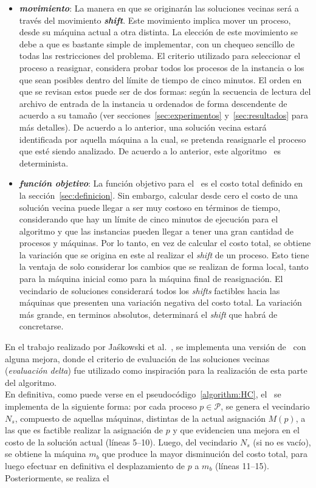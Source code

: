 \documentclass[../informe2.tex]{subfiles}
\begin{document}
\begin{itemize}
	\item \textbf{\textit{movimiento}}: La manera en que se originarán las soluciones vecinas será a través del movimiento \textbf{\textit{shift}}. Este movimiento implica mover un proceso, desde su máquina actual a otra distinta. La elección de este movimiento se debe a que es bastante simple de implementar, con un chequeo sencillo de todas las restricciones del problema. El criterio utilizado para seleccionar el proceso a reasignar, considera probar todos los procesos de la instancia o los que sean posibles dentro del límite de tiempo de cinco minutos. El orden en que se revisan estos puede ser de dos formas: según la secuencia de lectura del archivo de entrada de la instancia u ordenados de forma descendente de acuerdo a su tamaño (ver secciones~\ref{sec:experimentos} y~\ref{sec:resultados} para más detalles). De acuerdo a lo anterior, una solución vecina estará identificada por aquella máquina a la cual, se pretenda reasignarle el proceso que esté siendo analizado. De acuerdo a lo anterior, este algoritmo \hillc\ es determinista.
	\item \textbf{\textit{función objetivo}}: La función objetivo para el \mrp\ es el costo total definido en la sección~\ref{sec:definicion}. Sin embargo, calcular desde cero el costo de una solución vecina puede llegar a ser muy costoso en términos de tiempo, considerando que hay un límite de cinco minutos de ejecución para el algoritmo y que las instancias pueden llegar a tener una gran cantidad de procesos y máquinas. Por lo tanto, en vez de calcular el costo total, se obtiene la variación que se origina en este al realizar el \textit{shift} de un proceso. Esto tiene la ventaja de solo considerar los cambios que se realizan de forma local, tanto para la máquina inicial como para la máquina final de reasignación. El vecindario de soluciones considerará todos los \textit{shifts} factibles hacia las máquinas que presenten una variación negativa del costo total. La variación más grande, en terminos absolutos, determinará el \textit{shift} que habrá de concretarse.
\end{itemize}
En el trabajo realizado por Jaśkowski et al.~\cite{jaskowskihybrid}, se implementa una versión de \hillc\ con alguna mejora, donde el criterio de evaluación de las soluciones vecinas (\textit{evaluación delta}) fue utilizado como inspiración para la realización de esta parte del algoritmo.\\
En definitiva, como puede verse en el pseudocódigo~\ref{algorithm:HC}, el \hillc\ se implementa de la siguiente forma: por cada proceso $p \in \mathcal{P}$, se genera el vecindario $N_s$, compuesto de aquellas máquinas, distintas de la actual asignación $M(p)$, a las que es factible realizar la asignación de $p$ y que evidencien una mejora en el costo de la solución actual (líneas 5--10). Luego, del vecindario $N_s$ (si no es vacío), se obtiene la máquina $m_b$ que produce la mayor disminución del costo total, para luego efectuar en definitiva el desplazamiento de $p$ a $m_b$ (líneas 11--15). Posteriormente, se realiza el
\end{document}
